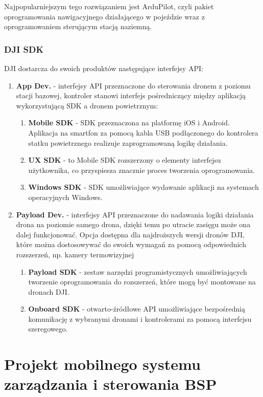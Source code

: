 Najpopularniejszym tego rozwiązaniem jest ArduPilot, czyli pakiet oprogramowania nawigacyjnego działającego w pojeździe wraz z oprogramowaniem sterującym stacją naziemną.

\subsubsection{DJI SDK}
DJI dostarcza do swoich produktów następujące interfejsy API:
\begin{enumerate}
  \item \textbf{App Dev.} - interfejsy API przeznaczone do sterowania dronem z poziomu stacji bazowej, kontroler stanowi interfejs pośredniczący między aplikacją wykorzystującą SDK a dronem powietrznym:\begin{enumerate}
    \item \textbf{Mobile SDK} - SDK przeznaczona na platformę iOS i Android. Aplikacja na smartfon za pomocą kabla USB podłączonego do kontrolera statku powietrznego realizuje zaprogramowaną logikę działania.
    \item \textbf{UX SDK} - to Mobile SDK rozszerzony o elementy interfejsu użytkownika, co przyspiesza znacznie proces tworzenia oprogramowania.
    \item \textbf{Windows SDK} - SDK umożliwiające wydawanie aplikacji na systemach operacyjnych Windows. 
  \end{enumerate}
  \item \textbf{Payload Dev.} - interfejsy API przeznaczone do nadawania logiki działania drona na poziomie samego drona, dzięki temu po utracie zasięgu może ona dalej funkcjonować. Opcja dostępna dla najdroższych wersji dronów DJI, które można dostosowywać do swoich wymagań za pomocą odpowiednich rozszerzeń, np. kamery termowizyjnej\begin{enumerate}
    \item \textbf{Payload SDK} - zestaw narzędzi programistycznych umożliwiających tworzenie oprogramowania do rozszerzeń, które mogą być montowane na dronach DJI. 
    \item \textbf{Onboard SDK} - otwarto-źródłowe API umożliwiające bezpośrednią komunikację z wybranymi dronami i kontrolerami za pomocą interfejsu szeregowego.
  \end{enumerate}
\end{enumerate}

\newpage
\section{Projekt mobilnego systemu zarządzania i sterowania BSP}
